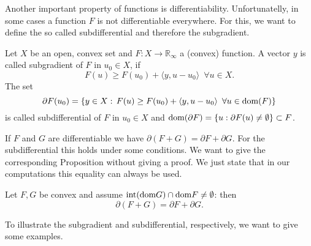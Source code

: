     Another important property of functions is differentiability. Unfortunatelly, in some cases a function $F$ is not differentiable everywhere. For this, we want to define the so called subdifferential and therefore the subgradient.

    \begin{definition} %
        \label{def:subgradient_subdifferential}

        Let $X$ be an open, convex set and $F: X \longrightarrow \mathbb{R}_{\infty}$ a (convex) function. A vector $y$ is called subgradient of $F$ in $u_{0} \in X$, if
            \begin{equation}
                F(u) \ge F(u_{0}) + \langle y, u - u_{0} \rangle \,\,\, \forall u \in X.
            \label{eq:subgradient}
            \end{equation}
        The set
            $$
                \partial F(u_{0}) = \{ y \in X: \, F(u) \ge F(u_{0}) + \langle y, u - u_{0} \rangle \,\,\, \forall u \in \textnormal{dom}(F) \}
            $$
        is called subdifferential of $F$ in $u_{0} \in X$ and $\textnormal{dom}(\partial F) = \{ u: \partial F(u) \ne \emptyset \} \subset F$.

    \end{definition}

    If $F$ and $G$ are differentiable we have $\partial(F + G) = \partial F + \partial G$. For the subdifferential this holds under some conditions. We want to give the corresponding Proposition without giving a proof. We just state that in our computations this equality can always be used.

    \begin{proposition} %

        Let $F, G$ be convex and assume $\textnormal{int} (\textnormal{dom} G) \cap \textnormal{dom} F \ne \emptyset$: then
            $$
                \partial(F + G) = \partial F + \partial G.
            $$
    
    \end{proposition}

    To illustrate the subgradient and subdifferential, respectively, we want to give some examples.

